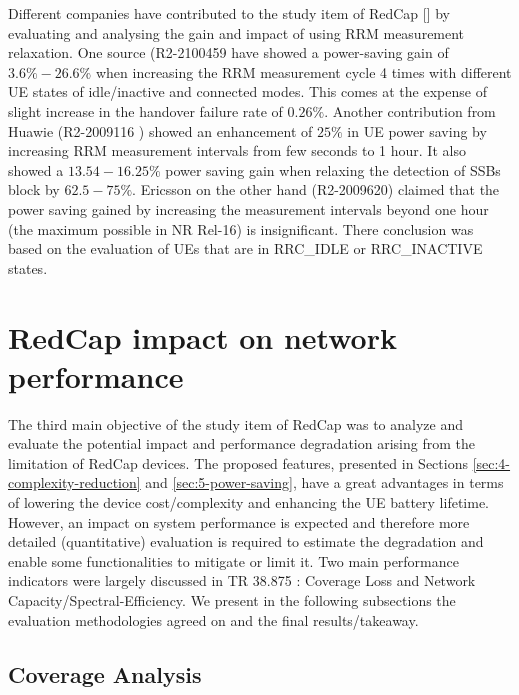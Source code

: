 \documentclass[conference]{IEEEtran}
\begin{document}
Different companies have contributed to the study item of RedCap [] by evaluating and analysing the gain and impact of using RRM measurement relaxation. One source (R2-2100459 \cite{3gpp_tp_2021_R2-2100459} have showed a power-saving gain of $3.6\% - 26.6\%$ when increasing the RRM measurement cycle 4 times with different UE states of idle/inactive and connected modes. This comes at the expense of slight increase in the handover failure rate of $0.26\%$.
Another contribution from Huawie (R2-2009116 \cite{3gpp_further_2020_R2-2009116}) showed an enhancement of $25\%$ in UE power saving by increasing RRM measurement intervals from few seconds to 1 hour. It also showed a $13.54-16.25\%$ power saving gain when relaxing the detection of SSBs block by $62.5-75\%$.
Ericsson on the other hand (R2-2009620) \cite{3gpp_redcap_2020_R2-2009620} claimed that the power saving gained by increasing the measurement intervals beyond one hour (the maximum possible in NR Rel-16) is insignificant. There conclusion was based on the evaluation of UEs that are in RRC\_IDLE or RRC\_INACTIVE states. 


\section{RedCap impact on network performance}
\label{sec:6-redcap-impact}
The third main objective of the study item of RedCap was to analyze and evaluate the potential impact and performance degradation arising from the limitation of RedCap devices. The  proposed features, presented in Sections \ref{sec:4-complexity-reduction} and \ref{sec:5-power-saving}, have a great advantages in terms of lowering the device cost/complexity and enhancing the UE battery lifetime. However, an impact on system performance is expected and therefore more detailed (quantitative) evaluation is required to estimate the degradation and enable some functionalities to mitigate or limit it. Two main performance indicators were largely discussed in TR 38.875 \cite{3gpp.38.875}: Coverage Loss and Network Capacity/Spectral-Efficiency. We present in the following subsections the evaluation methodologies agreed on and the final results/takeaway.  

\subsection{Coverage Analysis}
\label{sec:6-1}
\end{document}
